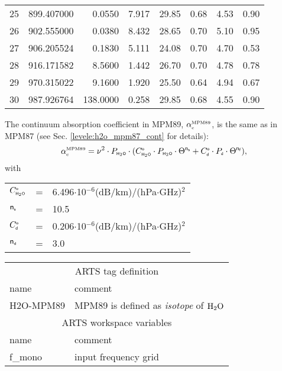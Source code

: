 {\begin{longtable}{rrrrrrrr}
25    &   899.407000&    0.0550&  7.917&   29.85&   0.68&  4.53&  0.90\\
26    &   902.555000&    0.0380&  8.432&   28.65&   0.70&  5.10&  0.95\\
27    &   906.205524&    0.1830&  5.111&   24.08&   0.70&  4.70&  0.53\\
28    &   916.171582&    8.5600&  1.442&   26.70&   0.70&  4.78&  0.78\\
29    &   970.315022&    9.1600&  1.920&   25.50&   0.64&  4.94&  0.67\\
30    &   987.926764&  138.0000&  0.258&   29.85&   0.68&  4.55&  0.90\\
\hline
\end{longtable}

\label{levele:h2o_mpm89_cont}
The continuum absorption coefficient in MPM89, $\alpha^{\mbox{\rm \tiny MPM89}}_{\mbox{\tiny c}}$, 
is the same as in MPM87 (see Sec. \ref{levele:h2o_mpm87_cont} for 
details):\\
\begin{equation} 
  \label{eq:mpm89:cont}
  \alpha^{\mbox{\rm \tiny MPM89}}_{\mbox{\tiny c}} = \nu^2 \cdot P_{\mbox{\tiny \sf H}_{2}\mbox{\tiny \sf O}} \cdot 
                (C^{\mbox{\tiny \sf o}}_{\mbox{\tiny \sf H}_{2}\mbox{\tiny \sf O}} \cdot P_{\mbox{\tiny \sf H}_{2}\mbox{\tiny \sf O}} \cdot \Theta^{{\sf n}_{\mbox{\tiny \sf s}}} + 
                 C^{\mbox{\tiny \sf o}}_{\mbox{\tiny \sf d}} \cdot P_{\mbox{\tiny \sf d}}  \cdot \Theta^{{\sf n}_{\mbox{\tiny \sf f}}}),
\end{equation}
with\\
\begin{tabular}{lcl}
$C^{\mbox{\tiny \sf o}}_{\mbox{\tiny \sf H}_{2}\mbox{\tiny \sf O}}$   & = & 6.496$\cdot$10$^{-6}$(dB/km)/(hPa$\cdot$GHz)$^2$\\
${\sf n}_{\mbox{\tiny \sf s}}$    & = & 10.5\\
$C^{\mbox{\tiny \sf o}}_{\mbox{\tiny \sf d}}$   & = & 0.206$\cdot$10$^{-6}$(dB/km)/(hPa$\cdot$GHz)$^2$\\
${\sf n}_{\mbox{\tiny \sf d}}$    & = & 3.0\\
\end{tabular}
%
%
\begin{center}
\begin{tabular}{ll}
\hline
\multicolumn{2}{c}{ARTS tag definition}\\
name      & comment \\
H2O-MPM89 & MPM89 is defined as {\it isotope} of $\mbox{H}_2\mbox{O}$\\
\hline
\multicolumn{2}{c}{ARTS workspace variables}\\
name & comment \\
 f\_mono & input frequency grid \\

\end{tabular}
\end{center}}
